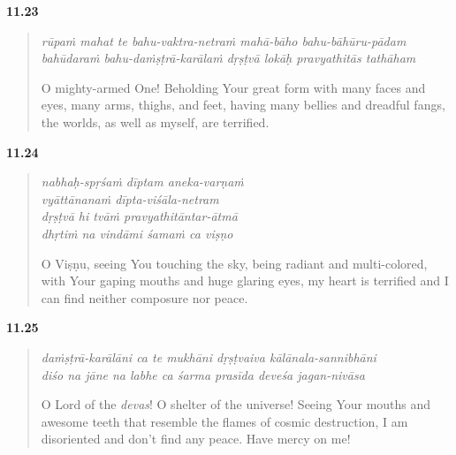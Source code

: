 \par\noindent\textbf{11.23}\par
\begin{verse}
\textit{rūpaṁ mahat te bahu-vaktra-netraṁ mahā-bāho bahu-bāhūru-pādam} \\
\textit{bahūdaraṁ bahu-daṁṣṭrā-karālaṁ dṛṣṭvā lokāḥ pravyathitās tathāham}

\noindent O mighty-armed One! Beholding Your great form with many faces and eyes, many arms, thighs, and feet, having many bellies and dreadful fangs, the worlds, as well as myself, are terrified.
\end{verse}
\par



\par\noindent\textbf{11.24}\par
\begin{verse}
\textit{nabhaḥ-spṛśaṁ dīptam aneka-varṇaṁ} \\
\textit{vyāttānanaṁ dīpta-viśāla-netram} \\
\textit{dṛṣṭvā hi tvāṁ pravyathitāntar-ātmā} \\
\textit{dhṛtiṁ na vindāmi śamaṁ ca viṣṇo}

\noindent O Viṣṇu, seeing You touching the sky, being radiant and multi-colored, with Your gaping mouths and huge glaring eyes, my heart is terrified and I can find neither composure nor peace.
\end{verse}
\par



\par\noindent\textbf{11.25}\par
\begin{verse}
\textit{daṁṣṭrā-karālāni ca te mukhāni dṛṣṭvaiva kālānala-sannibhāni} \\
\textit{diśo na jāne na labhe ca śarma prasīda deveśa jagan-nivāsa}

\noindent O Lord of the \textit{devas}! O shelter of the universe! Seeing Your mouths and awesome teeth that resemble the flames of cosmic destruction, I am disoriented and don't find any peace. Have mercy on me!
\end{verse}
\par



